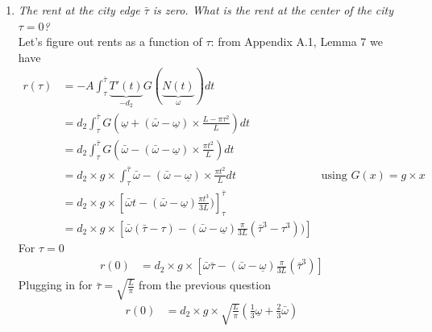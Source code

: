 \documentclass[10pt, final]{article}
\begin{document}
\begin{enumerate}[1.]
    \item \textit{The rent at the city edge $\bar{\tau}$ is zero. What is the rent at the center of the city $\tau = 0$?}
    \\
    Let's figure out rents as a function of $\tau$: from Appendix A.1, Lemma 7 we have
    \begin{align*}
        r(\tau) &= -A \int_{\tau}^{\bar{\tau}} \underbrace{T'(t)}_{-d_2} G(\underbrace{N(t)}_{\omega}) dt \\
        &=  d_2 \int_{\tau}^{\bar{\tau}} G(\underline{\omega} + (\bar{\omega} - \underline{\omega}) \times \frac{L - \pi \tau^2}{L})dt \\
        &= d_2 \int_{\tau}^{\bar{\tau}} G(\bar{\omega} - (\bar{\omega} - \underline{\omega}) \times \frac{\pi t^2}{L}) dt  \\
        &= d_2 \times g \times \int_{\tau}^{\bar{\tau}} \bar{\omega} - (\bar{\omega} - \underline{\omega}) \times \frac{\pi t^2}{L} dt & \text{using } G(x) = g \times x \\
        &= d_2 \times g \times [\bar{\omega} t - (\bar{\omega} - \underline{\omega}) \frac{\pi t^3}{3 L})]_{\tau}^{\bar{\tau}} \\
        &= d_2 \times g \times [\bar{\omega} (\bar{\tau} - \tau) - (\bar{\omega} - \underline{\omega}) \frac{\pi}{3 L} (\bar{\tau}^3 - \tau^3))]
    \end{align*}
    For $\tau = 0$
    \begin{align*}
        r(0) &= d_2 \times g \times [\bar{\omega} \bar{\tau} - (\bar{\omega} - \underline{\omega}) \frac{\pi}{3 L} (\bar{\tau}^3)] 
    \end{align*}
    Plugging in for $\bar{\tau} = \sqrt{\frac{L}{\pi}}$ from the previous question
    \begin{align*}
        r(0) &= d_2 \times g \times \sqrt{\frac{L}{\pi}} (\frac{1}{3} \underline{\omega} + \frac{2}{3} \bar{\omega})
    \end{align*}




\end{enumerate}
\end{document}
